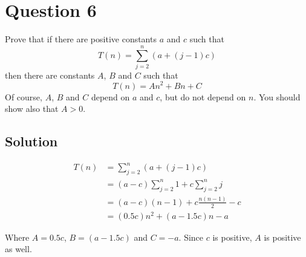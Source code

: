 
\section*{Question 6}

Prove that if there are positive constants $a$ and $c$ such that
\begin{equation}
T(n) = \sum_{j=2}^{n}(a + (j-1)c)
\end{equation}
then there are constants $A$, $B$ and $C$ such that
\begin{equation}
T(n) = An^2 + Bn + C
\end{equation}
Of course, $A$, $B$ and $C$ depend on $a$ and $c$, but do not depend on $n$.
You should show also that $A > 0$.

\subsection*{Solution}

\begin{equation}
\begin{aligned}
T(n) &= \sum_{j=2}^{n}(a + (j-1)c)\\
&=(a-c)\sum_{j=2}^{n}1+c\sum_{j=2}^{n}j\\
&=(a-c)(n-1)+c\frac{n(n-1)}{2}-c\\
&=(0.5c)n^2+(a-1.5c)n-a
\end{aligned}
\end{equation}

Where $A = 0.5c$, $B = (a - 1.5c)$ and $C = -a$.
Since $c$ is positive, $A$ is positive as well.
